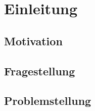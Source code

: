 \section{Einleitung}


\subsection{Motivation}

\subsection{Fragestellung}


\subsection{Problemstellung}